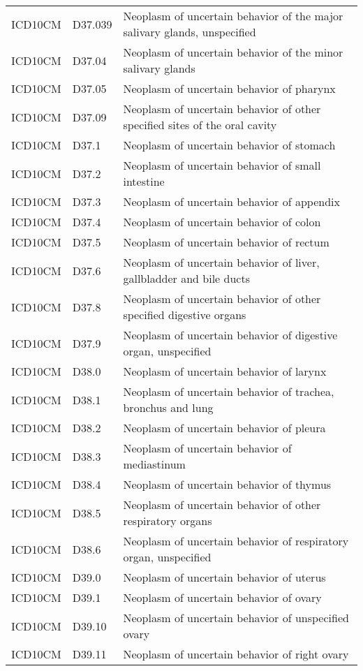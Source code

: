 \begin{longtable}{p{}p{}p{}}
  ICD10CM & D37.039 & Neoplasm of uncertain behavior of the major salivary glands, unspecified \\ 
  ICD10CM & D37.04 & Neoplasm of uncertain behavior of the minor salivary glands \\ 
  ICD10CM & D37.05 & Neoplasm of uncertain behavior of pharynx \\ 
  ICD10CM & D37.09 & Neoplasm of uncertain behavior of other specified sites of the oral cavity \\ 
  ICD10CM & D37.1 & Neoplasm of uncertain behavior of stomach \\ 
  ICD10CM & D37.2 & Neoplasm of uncertain behavior of small intestine \\ 
  ICD10CM & D37.3 & Neoplasm of uncertain behavior of appendix \\ 
  ICD10CM & D37.4 & Neoplasm of uncertain behavior of colon \\ 
  ICD10CM & D37.5 & Neoplasm of uncertain behavior of rectum \\ 
  ICD10CM & D37.6 & Neoplasm of uncertain behavior of liver, gallbladder and bile ducts \\ 
  ICD10CM & D37.8 & Neoplasm of uncertain behavior of other specified digestive organs \\ 
  ICD10CM & D37.9 & Neoplasm of uncertain behavior of digestive organ, unspecified \\ 
  ICD10CM & D38.0 & Neoplasm of uncertain behavior of larynx \\ 
  ICD10CM & D38.1 & Neoplasm of uncertain behavior of trachea, bronchus and lung \\ 
  ICD10CM & D38.2 & Neoplasm of uncertain behavior of pleura \\ 
  ICD10CM & D38.3 & Neoplasm of uncertain behavior of mediastinum \\ 
  ICD10CM & D38.4 & Neoplasm of uncertain behavior of thymus \\ 
  ICD10CM & D38.5 & Neoplasm of uncertain behavior of other respiratory organs \\ 
  ICD10CM & D38.6 & Neoplasm of uncertain behavior of respiratory organ, unspecified \\ 
  ICD10CM & D39.0 & Neoplasm of uncertain behavior of uterus \\ 
  ICD10CM & D39.1 & Neoplasm of uncertain behavior of ovary \\ 
  ICD10CM & D39.10 & Neoplasm of uncertain behavior of unspecified ovary \\ 
  ICD10CM & D39.11 & Neoplasm of uncertain behavior of right ovary \\ 

\end{longtable}
